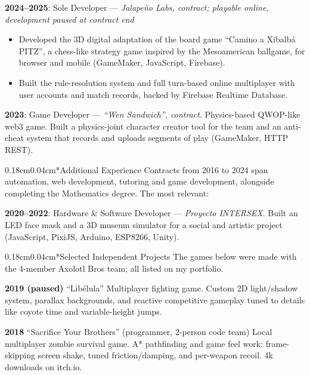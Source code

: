 \documentclass[10.5pt]{article}
\makeatletter
\providecommand{\href}[2]{#2}
\renewcommand{\section}{\@startsection{section}{1}{0pt}%
  {0.18cm}{0.04cm}{\normalfont\large\bfseries}}
\makeatother
\begin{document}
\textbf{2024--2025}: Sole Developer --- \textit{Jalapeño Labs, contract; playable online, development paused at contract end}
\begin{itemize}
    \item Developed the 3D digital adaptation of the board game \href{https://jalapenolab.mx/pages/pitz}{``Camino a Xibalbá PITZ''}, a chess-like strategy game inspired by the Mesoamerican ballgame, for browser and mobile (GameMaker, JavaScript, Firebase).
    \item Built the rule-resolution system and full turn-based online multiplayer with user accounts and match records, backed by Firebase Realtime Database.
\end{itemize}

\textbf{2023}: Game Developer --- \textit{``Wen Sandwich'', contract}. Physics-based QWOP-like web3 game. Built a physics-joint character creator tool for the team and an anti-cheat system that records and uploads segments of play (GameMaker, HTTP REST).

\section*{Additional Experience}
Contracts from 2016 to 2024 span automation, web development, tutoring and game development, alongside completing the Mathematics degree. The most relevant:

\textbf{2020--2022}: Hardware \& Software Developer --- \textit{Proyecto INTERSEX}. Built an LED face mask and a 3D museum simulator for a social and artistic project (JavaScript, PixiJS, Arduino, ESP8266, Unity).

\section*{Selected Independent Projects}
The games below were made with the 4-member Axolotl Bros team; all listed on my portfolio.

\textbf{2019 (paused)} ``Libélula'' Multiplayer fighting game. Custom 2D light/shadow system, parallax backgrounds, and reactive competitive gameplay tuned to details like coyote time and variable-height jumps.

\textbf{2018} \href{https://axolotlbros.itch.io/sacrifice-your-brothers}{``Sacrifice Your Brothers''} (programmer, 2-person code team) Local multiplayer zombie survival game. A* pathfinding and game feel work: frame-skipping screen shake, tuned friction/damping, and per-weapon recoil. 4k downloads on itch.io.
\end{document}
